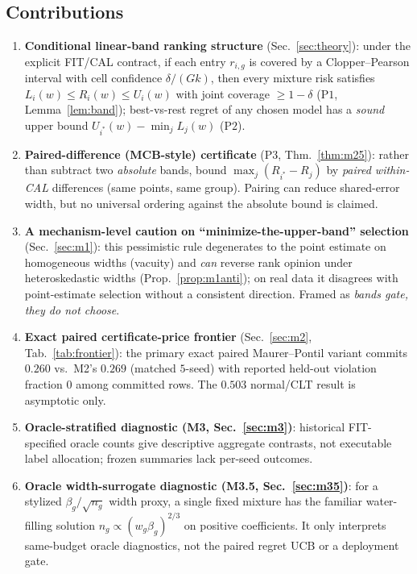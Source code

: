 \documentclass{article}
\begin{document}
\subsection{Contributions}
\begin{enumerate}
\item \textbf{Conditional linear-band ranking structure} (Sec.~\ref{sec:theory}): under the
explicit FIT/CAL contract, if each entry
$r_{i,g}$ is covered by a Clopper--Pearson interval with cell confidence
$\delta/(G k)$, then every mixture risk satisfies $L_i(w)\le R_i(w)\le U_i(w)$ with joint
coverage $\ge 1-\delta$ ($\mathrm{P1}$, Lemma~\ref{lem:band}); best-vs-rest regret of any
chosen model has a \emph{sound} upper bound $U_{i^*}(w)-\min_j L_j(w)$ ($\mathrm{P2}$).
\item \textbf{Paired-difference (MCB-style) certificate} ($\mathrm{P3}$, Thm.~\ref{thm:m25}):
rather than subtract two \emph{absolute} bands, bound $\max_j(R_{i^*}-R_j)$ by
\emph{paired within-CAL} differences (same points, same group). Pairing can reduce shared-error
width, but no universal ordering against the absolute bound is claimed.
\item \textbf{A mechanism-level caution on ``minimize-the-upper-band'' selection}
(Sec.~\ref{sec:m1}): this pessimistic rule degenerates to the point estimate on homogeneous
widths (vacuity) and \emph{can} reverse rank opinion under heteroskedastic widths
(Prop.~\ref{prop:m1anti}); on real data it disagrees with point-estimate selection without a
consistent direction. Framed as \emph{bands gate, they do not choose}.
\item \textbf{Exact paired certificate-price frontier} (Sec.~\ref{sec:m2}, Tab.~\ref{tab:frontier}):
the primary exact paired Maurer--Pontil variant commits $0.260$ vs.\ M2's $0.269$ (matched
$5$-seed) with reported held-out violation fraction $0$ among committed rows. The $0.503$
normal/CLT result is asymptotic only.
\item \textbf{Oracle-stratified diagnostic (M3, Sec.~\ref{sec:m3})}: historical FIT-specified
oracle counts give descriptive aggregate contrasts, not executable label allocation; frozen
summaries lack per-seed outcomes.
\item \textbf{Oracle width-surrogate diagnostic (M3.5, Sec.~\ref{sec:m35})}: for a
stylized $\beta_g/\sqrt{n_g}$ width proxy, a single fixed mixture has the familiar
water-filling solution $n_g\propto(w_g\beta_g)^{2/3}$ on positive coefficients. It only
interprets same-budget oracle diagnostics, not the paired regret UCB or a deployment gate.
\end{enumerate}
\end{document}

